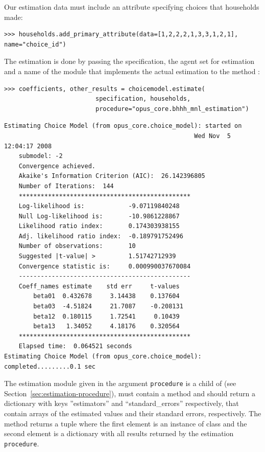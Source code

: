 Our estimation data must include an attribute \attributesindex specifying choices that
households made:
\begin{verbatim}
>>> households.add_primary_attribute(data=[1,2,2,2,1,3,3,1,2,1], name="choice_id")
\end{verbatim}

The estimation is done by passing the specification, the agent set for
estimation and a name of the module that implements the actual estimation to
the method :
\coefficientsindex
\begin{verbatim}
>>> coefficients, other_results = choicemodel.estimate(
                         specification, households, 
                         procedure="opus_core.bhhh_mnl_estimation")
\end{verbatim}
\begin{verbatim}
Estimating Choice Model (from opus_core.choice_model): started on 
                                                    Wed Nov  5 12:04:17 2008
    submodel: -2
    Convergence achieved.
    Akaike's Information Criterion (AIC):  26.142396805
    Number of Iterations:  144
    ***********************************************
    Log-likelihood is:            -9.07119840248
    Null Log-likelihood is:       -10.9861228867
    Likelihood ratio index:       0.174303938155
    Adj. likelihood ratio index:  -0.189791752496
    Number of observations:       10
    Suggested |t-value| >         1.51742712939
    Convergence statistic is:     0.000990037670084
    -----------------------------------------------
    Coeff_names	estimate	std err		t-values
        beta01	0.432678	 3.14438	0.137604
        beta03	-4.51824	 21.7087	-0.208131
        beta12	0.180115	 1.72541	 0.10439
        beta13	 1.34052	 4.18176	0.320564
    ***********************************************
    Elapsed time:  0.064521 seconds
Estimating Choice Model (from opus_core.choice_model): completed.........0.1 sec

\end{verbatim}
The estimation module given in the argument \verb|procedure| is a child of
 (see Section~\ref{sec:estimation-procedure}), must
contain a method  and should return a dictionary with keys
''estimators'' and ``standard_errors'' respectively, that contain arrays of
the estimated values and their standard errors, respectively.  The 
method returns a tuple where the first element is an instance of
class  \coefficientsindex and the second element is a dictionary with all
results returned by the estimation \verb|procedure|.

